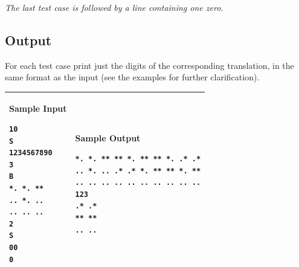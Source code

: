 \emph{The last test case is followed by a line containing one zero.}

\subsection*{Output}
For each test case print just the digits of the corresponding translation,
in the same format as the input (see the examples for further
clarification).

\newpage

\begin{table}[!ht]
\centering
\begin{tabular}{|l|l|}
\hline
\begin{minipage}[t]{3in}
\textbf{Sample Input}
\begin{verbatim}
10
S
1234567890
3
B
*. *. **
.. *. ..
.. .. ..
2
S
00
0
\end{verbatim}
\vspace{1mm}
\end{minipage}
&

\begin{minipage}[t]{3in}
\textbf{Sample Output}
\begin{verbatim}
*. *. ** ** *. ** ** *. .* .*
.. *. .. .* .* *. ** ** *. **
.. .. .. .. .. .. .. .. .. ..
123
.* .*
** **
.. ..
\end{verbatim}
\vspace{1mm}
\end{minipage} \\
\hline
\end{tabular}
\end{table}

\newpage
